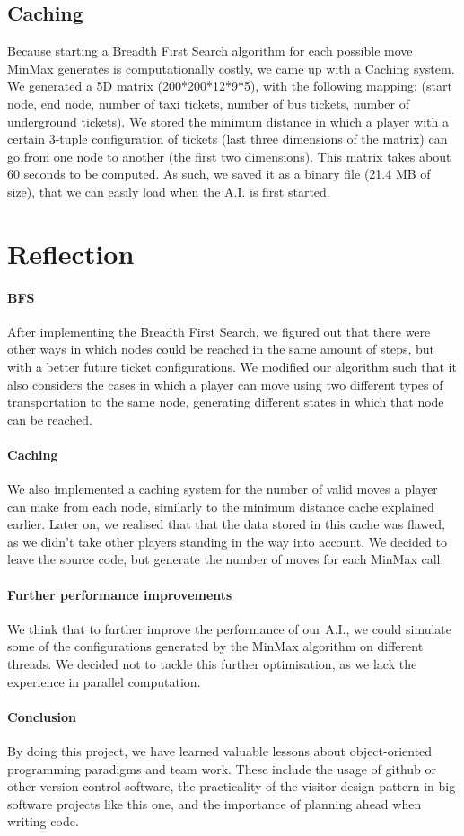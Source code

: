 \documentclass[12pt,a4paper]{scrartcl}
\begin{document}
\subsection*{Caching}
Because starting a Breadth First Search algorithm for each possible move MinMax generates is computationally costly, we came up with a Caching system. We generated a 5D matrix (200*200*12*9*5), with the following mapping: (start node, end node, number of taxi tickets, number of bus tickets, number of underground tickets). 
We stored the minimum distance in which a player with a certain 3-tuple configuration of tickets (last three dimensions of the matrix) can go from one node to another (the first two dimensions).
This matrix takes about 60 seconds to be computed. As such, we saved it as a binary file (21.4 MB of size), that we can easily load when the A.I. is first started.

\section{Reflection}

\paragraph{BFS} After implementing the Breadth First Search, we figured out that there were other ways in which nodes could be reached in the same amount of steps, but with a better future ticket configurations. We modified our algorithm such that it also considers the cases in which a player can move using two different types of transportation to the same node, generating different states in which that node can be reached.

\paragraph{Caching} We also implemented a caching system for the number of valid moves a player can make from each node, similarly to the minimum distance cache explained earlier. Later on, we realised that that the data stored in this cache was flawed, as we didn't take other players standing in the way into account. We decided to leave the source code, but generate the number of moves for each MinMax call.

\paragraph{Further performance improvements} We think that to further improve the performance of our A.I., we could simulate some of the configurations generated by the MinMax algorithm on different threads. We decided not to tackle this further optimisation, as we lack the experience in parallel computation.

\paragraph{Conclusion}
By doing this project, we have learned valuable lessons about object-oriented programming paradigms and team work. These include the usage of github or other version control software, the practicality of the visitor design pattern in big software projects like this one, and the importance of planning ahead when writing code.
\end{document}
